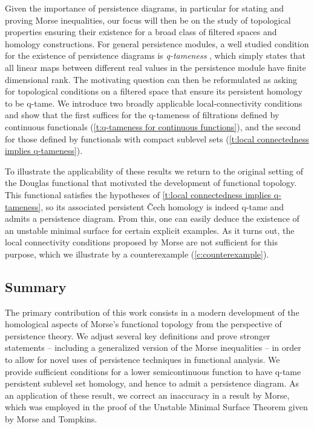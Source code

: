 Given the importance of persistence diagrams, in particular for stating and proving Morse inequalities, our focus will then be on the study of topological properties ensuring their existence for a broad class of filtered spaces and homology constructions.
For general persistence modules, a well studied condition for the existence of persistence diagrams is \emph{q-tameness} \cite{Chazal.2016a,Chazal.2016b}, which simply states that all linear maps between different real values in the persistence module have finite dimensional rank.
The motivating question can then be reformulated as asking for topological conditions on a filtered space that ensure its persistent homology to be q-tame.
We introduce two broadly applicable local-connectivity conditions and show that the first suffices for the \mbox{q-tameness} of filtrations defined by continuous functionals (\cref{t:q-tameness for continuous functions}), and the second for those defined by functionals with compact sublevel sets (\cref{t:local connectedness implies q-tameness}).

To illustrate the applicability of these results we return to the original setting of the Douglas functional that motivated the development of functional topology.
This functional satisfies the hypotheses of \cref{t:local connectedness implies q-tameness}, so its associated persistent \v{C}ech homology is indeed q-tame and admits a persistence diagram. From this, one can easily deduce the existence of an unstable minimal surface for certain explicit examples.
As it turns out, the local connectivity conditions proposed by Morse \cite{Morse.1937} are not sufficient for this purpose, which we illustrate by a counterexample (\cref{c:counterexample}).


\subsection*{Summary}

The primary contribution of this work consists in a modern development of the homological aspects of Morse's functional topology from the perspective of persistence theory.
We adjust several key definitions and prove stronger statements -- including a generalized version of the Morse inequalities -- in order to allow for novel uses of persistence techniques in functional analysis.
We provide sufficient conditions for a lower semicontinuous function to have q-tame persistent sublevel set homology, and hence to admit a persistence diagram.
As an application of these result, we correct an inaccuracy in a result by Morse, which was employed in the proof of the Unstable Minimal Surface Theorem given by Morse and Tompkins.


